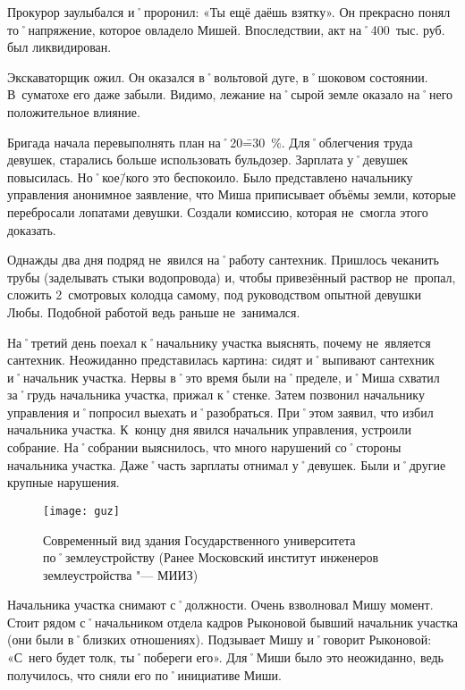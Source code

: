 Прокурор заулыбался и˚проронил: «Ты ещё даёшь взятку». Он прекрасно понял то˚напряжение, которое овладело Мишей. Впоследствии, акт на˚400~тыс. руб. был ликвидирован.

Экскаваторщик ожил. Он оказался в˚вольтовой дуге, в˚шоковом состоянии. В~суматохе его даже забыли. Видимо, лежание на˚сырой земле оказало на˚него положительное влияние. 

Бригада начала перевыполнять план на˚20\==30~\%. Для˚облегчения труда девушек, старались больше использовать бульдозер. Зарплата у˚девушек повысилась. Но˚кое\=/кого это беспокоило. Было представлено начальнику управления анонимное заявление, что Миша приписывает объёмы земли, которые перебросали лопатами девушки. Создали комиссию, которая не~смогла этого доказать.

Однажды два дня подряд не~явился на˚работу сантехник. Пришлось чеканить трубы (заделывать стыки водопровода) и, чтобы привезённый раствор не~пропал, сложить 2~смотровых колодца самому, под руководством опытной девушки Любы. Подобной работой ведь раньше не~занимался.

На˚третий день поехал к˚начальнику участка выяснять, почему не~является сантехник. Неожиданно представилась картина: сидят и˚выпивают сантехник и˚начальник участка. Нервы в˚это время были на˚пределе, и˚Миша схватил за˚грудь начальника участка, прижал к˚стенке. Затем позвонил начальнику управления и˚попросил выехать и˚разобраться. При˚этом заявил, что избил начальника участка. К~концу дня явился начальник управления, устроили собрание. На˚собрании выяснилось, что много нарушений со˚стороны начальника участка. Даже˚часть зарплаты отнимал у˚девушек. Были и˚другие крупные нарушения.

\begin{wrapfigure}{O}{.4\textwidth}
\centering
\texttt{[image: guz]}
\caption[Современный вид здания Государственного университета по˚землеустройству (Ранее Московский институт инженеров землеустройства "--- МИИЗ)]{Современный вид здания Государственного университета по˚землеустройству (Ранее Московский институт инженеров землеустройства "--- МИИЗ)\footnotemark}
\label{fig:guz}
\end{wrapfigure}

Начальника участка снимают с˚должности. Очень взволновал Мишу момент. Стоит рядом с˚начальником отдела кадров Рыконовой бывший начальник участка (они были в˚близких отношениях). Подзывает Мишу и˚говорит Рыконовой: «С~него будет толк, ты˚побереги его». Для˚Миши было это неожиданно, ведь получилось, что сняли его по˚инициативе Миши. 

